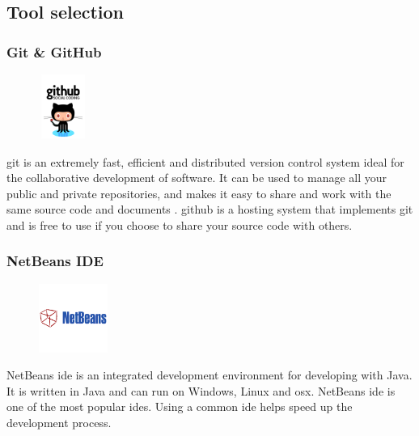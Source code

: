 \subsection{Tool selection}
\subsubsection{Git \& GitHub}
\begin{figure}
  \vspace{-40pt}
  \begin{center}
    \includegraphics[width=60px,height=80px]{GitHub}
  \end{center}

\end{figure}
\gls{git} is an extremely fast, efficient and distributed version control system ideal for the collaborative development of software. It can be used to manage all your public and private repositories, and makes it easy to share and work with the same source code and documents \cite{bib:git}. \gls{github} is a hosting system that implements git and is free to use if you choose to share your source code with others. 

\pagebreak

\subsubsection{NetBeans IDE}
\begin{figure}
  \vspace{-65pt}
  \begin{center}
    \includegraphics[width=0.2\textwidth]{NetBeans}
  \end{center}

\end{figure}
NetBeans \gls{ide} is an integrated development environment for developing with Java. It is written in Java and can run on Windows, Linux and \gls{osx}. NetBeans \gls{ide} is one of the most popular \gls{ide}s. Using a common \gls{ide} helps speed up the development process.   

